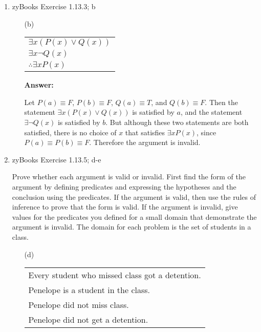 \documentclass[14pt]{extreport}
\newcommand{\answer}[0]{\medskip \textbf{Answer:} \medskip}
\begin{document}
\begin{enumerate}
    
    \item zyBooks Exercise 1.13.3; b
    
        \begin{enumerate}
            
            \item[(b)]
            \begin{tabular}{l}
                \( \exists x (P(x) \lor Q(x)) \) \\
                \( \exists x \neg Q(x) \) \\
                \hline
                \( \therefore \exists x P(x) \)
            \end{tabular}

                \answer

                Let \( P(a) \equiv F \), \( P(b) \equiv F \), \( Q(a) \equiv T \), and \( Q(b) \equiv F \). Then the statement \( \exists x (P(x) \lor Q(x)) \) is satisfied by \( a \), and the statement \( \exists \neg Q(x) \) is satisfied by \( b \). But although these two statements are both satisfied, there is no choice of \( x \) that satisfies \( \exists x P(x) \), since \( P(a) \equiv P(b) \equiv F \). Therefore the argument is invalid.

        \end{enumerate}

    \item zyBooks Exercise 1.13.5; d-e

    Prove whether each argument is valid or invalid. First find the form of the argument by defining predicates and expressing the hypotheses and the conclusion using the predicates. If the argument is valid, then use the rules of inference to prove that the form is valid. If the argument is invalid, give values for the predicates you defined for a small domain that demonstrate the argument is invalid. The domain for each problem is the set of students in a class.

        \begin{enumerate}
            
            \item[(d)] 
            \begin{tabular}{l}
                Every student who missed class got a detention. \\
                Penelope is a student in the class. \\
                Penelope did not miss class. \\
                \hline
                Penelope did not get a detention.
            \end{tabular}
            

\end{enumerate}
\end{enumerate}
\end{document}
